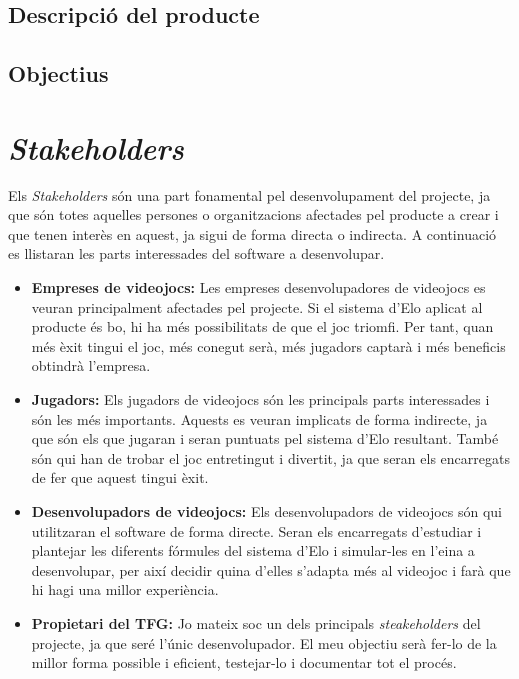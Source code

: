 \documentclass[a4paper]{article}
\begin{document}
\subsection{Descripció del producte}
\subsection{Objectius}

\newpage
\section{\textit{Stakeholders}}
Els \textit{Stakeholders} són una part fonamental pel desenvolupament del projecte, ja que són totes aquelles persones o organitzacions afectades pel producte a crear i que tenen interès en aquest, ja sigui de forma directa o indirecta. A continuació es llistaran les parts interessades del software a desenvolupar.

\begin{itemize}
    \item \textbf{Empreses de videojocs:} Les empreses desenvolupadores de videojocs es veuran principalment afectades pel projecte. Si el sistema d'Elo aplicat al producte és bo, hi ha més possibilitats de que el joc triomfi. Per tant, quan més èxit tingui el joc, més conegut serà, més jugadors captarà i més beneficis obtindrà l'empresa.
    
    \item \textbf{Jugadors:} Els jugadors de videojocs són les principals parts interessades i són les més importants. Aquests es veuran implicats de forma indirecte, ja que són els que jugaran i seran puntuats pel sistema d'Elo resultant. També són qui han de trobar el joc entretingut i divertit, ja que seran els encarregats de fer que aquest tingui èxit. 
    
    \item \textbf{Desenvolupadors de videojocs:} Els desenvolupadors de videojocs són qui utilitzaran el software de forma directe. Seran els encarregats d'estudiar i plantejar les diferents fórmules del sistema d'Elo i simular-les en l'eina a desenvolupar, per així decidir quina d'elles s'adapta més al videojoc i farà que hi hagi una millor experiència.
    
    \item \textbf{Propietari del TFG:} Jo mateix soc un dels principals \textit{steakeholders} del projecte, ja que seré l'únic desenvolupador. El meu objectiu serà fer-lo de la millor forma possible i eficient, testejar-lo i documentar tot el procés.
    
\end{itemize}
\end{document}
